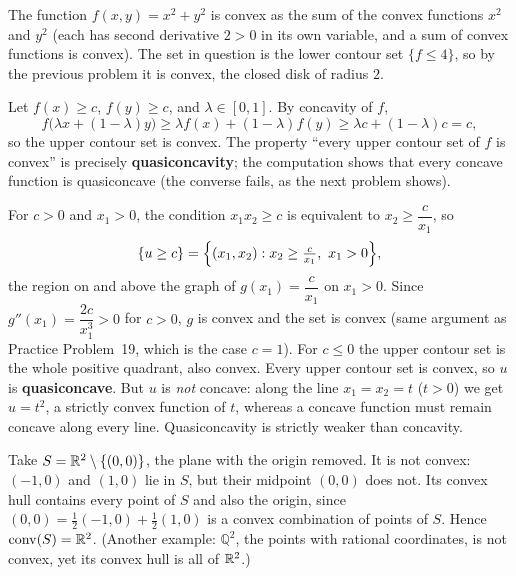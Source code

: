 \begin{solutions}
  \item The function $f(x,y)=x^{2}+y^{2}$ is convex as the sum of the
        convex functions $x^{2}$ and $y^{2}$ (each has second derivative
        $2>0$ in its own variable, and a sum of convex functions is
        convex). The set in question is the lower contour set
        $\{f\le 4\}$, so by the previous problem it is convex, the
        closed disk of radius $2$.

  \item Let $f(x)\ge c$, $f(y)\ge c$, and $\lambda\in[0,1]$. By concavity
        of $f$,
        \[
          f\bigl(\lambda x+(1-\lambda)y\bigr)
          \ge \lambda f(x)+(1-\lambda)f(y)
          \ge \lambda c+(1-\lambda)c=c ,
        \]
        so the upper contour set is convex. The property ``every upper
        contour set of $f$ is convex'' is precisely
        \textbf{quasiconcavity}; the computation shows that every concave
        function is quasiconcave (the converse fails, as the next problem
        shows).

  \item For $c>0$ and $x_{1}>0$, the condition $x_{1}x_{2}\ge c$ is
        equivalent to $x_{2}\ge \dfrac{c}{x_{1}}$, so
        \[
          \{u\ge c\}=\Bigl\{(x_{1},x_{2}): x_{2}\ge
          \tfrac{c}{x_{1}},\ x_{1}>0\Bigr\},
        \]
        the region on and above the graph of
        $g(x_{1})=\dfrac{c}{x_{1}}$ on $x_{1}>0$. Since
        $g''(x_{1})=\dfrac{2c}{x_{1}^{3}}>0$ for $c>0$, $g$ is convex and
        the set is convex (same argument as Practice Problem~19, which is
        the case $c=1$). For $c\le 0$ the upper contour set is the whole
        positive quadrant, also convex. Every upper contour set is convex,
        so $u$ is \textbf{quasiconcave}. But $u$ is \emph{not} concave:
        along the line $x_{1}=x_{2}=t$ ($t>0$) we get $u=t^{2}$, a strictly
        convex function of $t$, whereas a concave function must remain
        concave along every line. Quasiconcavity is strictly weaker than
        concavity.

  \item Take $S=\mathbb{R}^{2}\setminus\{(0,0)\}$, the plane with the origin
        removed. It is not convex: $(-1,0)$ and $(1,0)$ lie in $S$, but
        their midpoint $(0,0)$ does not. Its convex hull contains every
        point of $S$ and also the origin, since
        $(0,0)=\tfrac12(-1,0)+\tfrac12(1,0)$ is a convex combination of
        points of $S$. Hence $\operatorname{conv}(S)=\mathbb{R}^{2}$.
        (Another example: $\mathbb{Q}^{2}$, the points with rational
        coordinates, is not convex, yet its convex hull is all of
        $\mathbb{R}^{2}$.)


\end{solutions}

